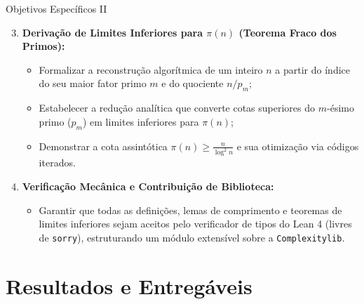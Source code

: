 \documentclass[10pt, aspectratio=43]{beamer}
\begin{document}
\begin{frame}{Objetivos Específicos II}
\begin{enumerate}
    \setcounter{enumi}{2}
    \item \textbf{Derivação de Limites Inferiores para $\pi(n)$ (Teorema Fraco dos Primos):}
    \begin{itemize}
        \item Formalizar a reconstrução algorítmica de um inteiro $n$ a partir do índice do seu maior fator primo $m$ e do quociente $n/p_m$;
        \item Estabelecer a redução analítica que converte cotas superiores do $m$-ésimo primo ($p_m$) em limites inferiores para $\pi(n)$;
        \item Demonstrar a cota assintótica $\pi(n) \ge \frac{n}{\log^2 n}$ e sua otimização via códigos iterados.
    \end{itemize}
    \medskip
    \item \textbf{Verificação Mecânica e Contribuição de Biblioteca:}
    \begin{itemize}
        \item Garantir que todas as definições, lemas de comprimento e teoremas de limites inferiores sejam aceitos pelo verificador de tipos do Lean 4 (livres de \texttt{sorry}), estruturando um módulo extensível sobre a \texttt{Complexitylib}.
    \end{itemize}
\end{enumerate}
\end{frame}

\section{Resultados e Entregáveis}
\end{document}
